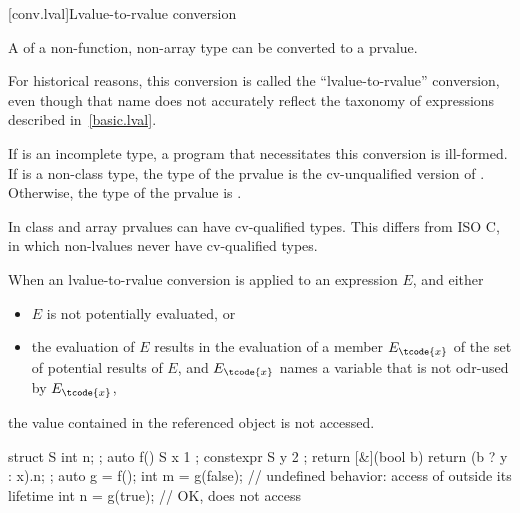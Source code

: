 [conv.lval]{Lvalue-to-rvalue conversion}

\pnum
{}%
%
A  of a non-function, non-array type 
can be converted to
a prvalue.
\begin{footnote}
For historical reasons, this conversion is called the ``lvalue-to-rvalue''
conversion, even though that name does not accurately reflect the taxonomy
of expressions described in~\ref{basic.lval}.
\end{footnote}
If  is an incomplete type, a
program that necessitates this conversion is ill-formed. If 
is a non-class type, the type of the prvalue is
the cv-unqualified version of . Otherwise, the type of the
prvalue is .
\begin{footnote}
In \Cpp{} class and array prvalues can have cv-qualified types.
This differs from ISO C, in which non-lvalues never have
cv-qualified types.
\end{footnote}

\pnum
When an lvalue-to-rvalue conversion
is applied to an expression $E$, and either
\begin{itemize}
\item $E$ is not potentially evaluated, or
\item the evaluation of $E$ results in the evaluation of a member
  $E_\tcode{x}$ of the set of potential results of $E$, and $E_\tcode{x}$
  names a variable  that is not odr-used by
  $E_\tcode{x}$,
\end{itemize}
the value contained in the referenced object is not accessed.
\begin{example}
\begin{codeblock}
struct S { int n; };
auto f() {
S x { 1 };
constexpr S y { 2 };
return [&](bool b) { return (b ? y : x).n; };
}
auto g = f();
int m = g(false);   // undefined behavior: access of  outside its lifetime
int n = g(true);    // OK, does not access 
\end{codeblock}
\end{example}

